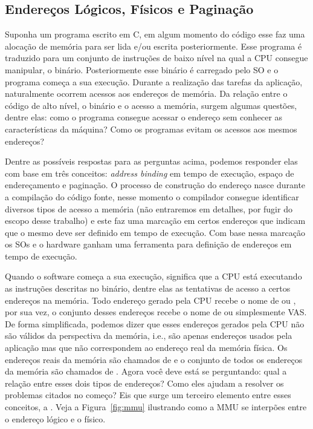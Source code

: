
\subsection{Endereços Lógicos, Físicos e Paginação}


Suponha um programa escrito em C, em algum momento do código esse faz uma
alocação de memória para ser lida e/ou escrita posteriormente. Esse programa é
traduzido para um conjunto de instruções de baixo nível na qual a CPU consegue
manipular, o binário. Posteriormente esse binário é carregado pelo SO e o
programa começa a sua execução. Durante a realização das tarefas da aplicação,
naturalmente ocorrem acessos aos endereços de memória. Da relação entre o
código de alto nível, o binário e o acesso a memória, surgem algumas questões,
dentre elas: como o programa consegue acessar o endereço sem conhecer as
características da máquina? Como os programas evitam os acessos aos mesmos
endereços?

Dentre as possíveis respostas para as perguntas acima, podemos responder elas
com base em três conceitos: \textit{address binding} em tempo de execução,
espaço de endereçamento e paginação. O processo de construção do endereço nasce
durante a compilação do código fonte, nesse momento o compilador consegue
identificar diversos tipos de acesso a memória (não entraremos em detalhes, por
fugir do escopo desse trabalho) e este faz uma marcação em certos endereços que
indicam que o mesmo deve ser definido em tempo de execução. Com base nessa
marcação os SOs e o hardware ganham uma ferramenta para definição de endereços
em tempo de execução.

Quando o software começa a sua execução, significa que a CPU está executando as
instruções descritas no binário, dentre elas as tentativas de acesso a certos
endereços na memória. Todo endereço gerado pela CPU recebe o nome de
 ou , por sua vez,
o conjunto desses endereços recebe o nome de  ou simplesmente VAS. De forma
simplificada, podemos dizer que esses endereços gerados pela CPU não são
válidos da perspectiva da memória, i.e., são apenas endereços usados pela
aplicação mas que não correspondem ao endereço real da memória física. Os
endereços reais da memória são chamados de  e o
conjunto de todos os endereços da memória são chamados de . Agora você deve está se perguntando: qual a relação
entre esses dois tipos de endereços? Como eles ajudam a resolver os problemas
citados no começo? Eis que surge um terceiro elemento entre esses conceitos, a
. Veja a Figura~\ref{fig:mmu}
ilustrando como a MMU se interpões entre o endereço lógico e o físico.


